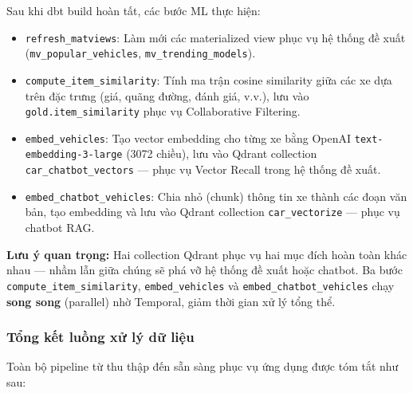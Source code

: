 Sau khi dbt build hoàn tất, các bước ML thực hiện:

\begin{itemize}
    \item \texttt{refresh\_matviews}: Làm mới các materialized view phục vụ hệ thống đề xuất (\texttt{mv\_popular\_vehicles}, \texttt{mv\_trending\_models}).
    \item \texttt{compute\_item\_similarity}: Tính ma trận cosine similarity giữa các xe dựa trên đặc trưng (giá, quãng đường, đánh giá, v.v.), lưu vào \texttt{gold.item\_similarity} phục vụ Collaborative Filtering.
    \item \texttt{embed\_vehicles}: Tạo vector embedding cho từng xe bằng OpenAI \texttt{text-embedding-3-large} (3072 chiều), lưu vào Qdrant collection \texttt{car\_chatbot\_vectors} — phục vụ Vector Recall trong hệ thống đề xuất.
    \item \texttt{embed\_chatbot\_vehicles}: Chia nhỏ (chunk) thông tin xe thành các đoạn văn bản, tạo embedding và lưu vào Qdrant collection \texttt{car\_vectorize} — phục vụ chatbot RAG.
\end{itemize}

\textbf{Lưu ý quan trọng:} Hai collection Qdrant phục vụ hai mục đích hoàn toàn khác nhau — nhầm lẫn giữa chúng sẽ phá vỡ hệ thống đề xuất hoặc chatbot. Ba bước \texttt{compute\_item\_similarity}, \texttt{embed\_vehicles} và \texttt{embed\_chatbot\_vehicles} chạy \textbf{song song} (parallel) nhờ Temporal, giảm thời gian xử lý tổng thể.

\subsubsection{Tổng kết luồng xử lý dữ liệu}

Toàn bộ pipeline từ thu thập đến sẵn sàng phục vụ ứng dụng được tóm tắt như sau:

